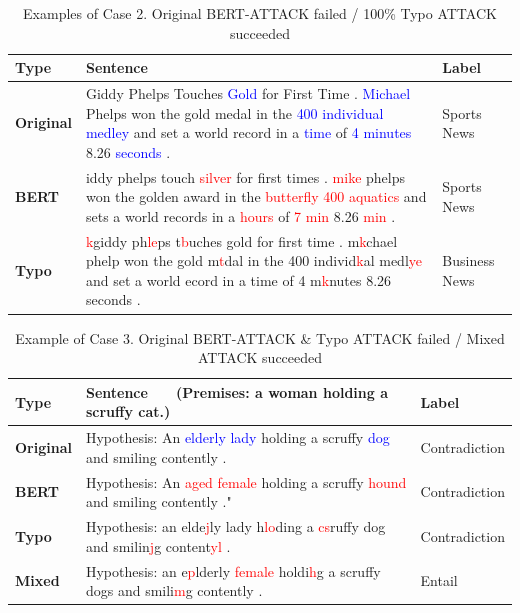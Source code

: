 \documentclass[11pt,a4paper]{article}
\newcommand{\red}[1]{\textcolor{red}{#1}}
\newcommand{\blue}[1]{\textcolor{blue}{#1}}
\begin{document}
{\renewcommand{\arraystretch}{1.5}
\begin{table}[]
{\small
\begin{tabularx}{\textwidth}{l|X|l}
\hline
\textbf{Type} & \textbf{Sentence}  & \textbf{Label} \\ \hline
\textbf{Original}  & Giddy Phelps Touches \blue{Gold} for First Time . \blue{Michael} Phelps won the gold medal in the \blue{400 individual medley} and set a world record in a \blue{time} of \blue{4 minutes} 8.26 \blue{seconds} . & Sports News   \\ \hline
\textbf{BERT} & iddy phelps touch \red{silver} for first times . \red{mike} phelps won the golden award in the \red{butterfly 400 aquatics} and sets a world records in a \red{hours} of \red{7 min} 8.26 \red{min} .      & Sports News   \\ \hline
\textbf{Typo} & \red{k}giddy ph\red{le}ps t\red{b}uches gold for first time . m\red{k}chael phelp won the gold m\red{t}dal in the 400 individ\red{k}al medl\red{ye} and set a world ecord in a time of 4 m\red{k}nutes 8.26 seconds .  & Business News \\ \hline
\end{tabularx}
}
\caption{Examples of Case 2. Original BERT-ATTACK failed / 100\% Typo ATTACK succeeded}
\end{table}
}

{\renewcommand{\arraystretch}{1.5}
\begin{table}[]
{\small
\begin{tabularx}{\textwidth}{l|X|l}
\hline
\textbf{Type} & \textbf{Sentence}$\qquad$(Premises: a woman holding a scruffy cat.) & \textbf{Label} \\ \hline
\textbf{Original}  & Hypothesis: An \blue{elderly lady} holding a scruffy \blue{dog} and smiling contently .     
& Contradiction \\ \hline
\textbf{BERT}  & Hypothesis: An \red{aged female} holding a scruffy \red{hound} and smiling contently ."    & Contradiction \\ \hline
\textbf{Typo}  & Hypothesis: an elde\red{j}ly lady h\red{lo}ding a \red{cs}ruffy dog and smilin\red{j}g content\red{yl} .    & Contradiction \\ \hline
\textbf{Mixed} & Hypothesis: an e\red{p}lderly \red{female} holdi\red{h}g a scruffy dogs and smili\red{m}g contently . & Entail        \\ \hline
\end{tabularx}
}
\caption{Example of Case 3. Original BERT-ATTACK \& Typo ATTACK failed / Mixed ATTACK succeeded}
\end{table}
}
\end{document}
